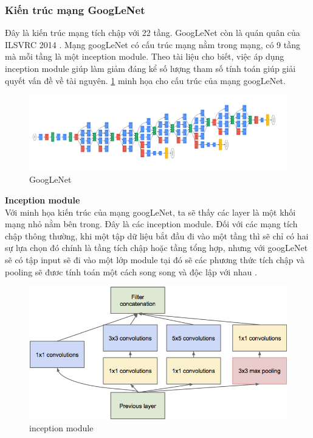	\subsubsection{Kiến trúc mạng GoogLeNet}
	
	Đây là kiến trúc mạng tích chập với 22 tầng. GoogLeNet còn là quán quân của ILSVRC 2014 \cite{1}. Mạng googLeNet có cấu trúc mạng nằm trong mạng, có 9 tầng mà mỗi tầng là một inception module. Theo tài liệu cho biết, việc áp dụng inception module giúp làm giảm đáng kể số lượng tham số tính toán giúp giải quyết vấn đề về tài nguyên. \ref{fig:googlenet} minh họa cho cấu trúc của mạng googLeNet.
	
		
	\begin{figure}[h!]
			\centering
			\includegraphics[scale=0.7]{charts/googlenet.png}
			\caption{GoogLeNet \cite{1}}
			\label{fig:googlenet}
		\end{figure}
		
	
	\textbf{Inception module}\\
	Với minh họa kiến trúc của mạng googLeNet, ta sẽ thấy các layer là một khối mạng nhỏ nằm bên trong. Đây là các inception module. Đối với các mạng tích chập thông thường, khi một tập dữ liệu bắt đầu đi vào một tầng thì sẽ chỉ có hai sự lựa chọn đó chính là tầng tích chập hoặc tầng tổng hợp, nhưng với googLeNet sẽ có tập input sẽ đi vào một lớp module tại đó sẽ các phương thức tích chập và pooling sẽ đươc tính toán một cách song song và độc lập với nhau \cite{1}.
	
	\begin{figure}[h!]
			\centering
			\includegraphics[scale=1.5]{charts/inception.png}
			\caption{inception module \cite{1}}
			\label{fig:inception}
	\end{figure}

